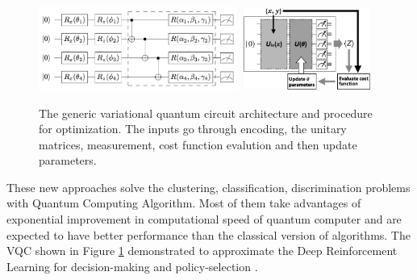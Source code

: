 \documentclass{article}
\begin{document}
\begin{figure}[h]
  \begin{center}
    \includegraphics[width=0.58\textwidth]{vqc.png} 
    \includegraphics[width=0.38\textwidth]{vqc1.png} 
  \end{center}
  \caption{The generic variational quantum circuit 
  architecture and procedure for optimization. The 
  inputs go through encoding, the unitary matrices, 
  measurement, cost function evalution and then 
  update parameters. 
  }
  \label{vqcc}
\end{figure}

These new approaches solve 
the clustering, classification, discrimination problems with
Quantum Computing Algorithm. Most of them take advantages of exponential 
improvement in computational speed of quantum computer and are expected 
to have better performance than the classical version of algorithms. 
The VQC shown in Figure \ref{vqcc} demonstrated to 
approximate the Deep Reinforcement Learning for decision-making 
and policy-selection \cite{ieee_vqc}. 
\end{document}
